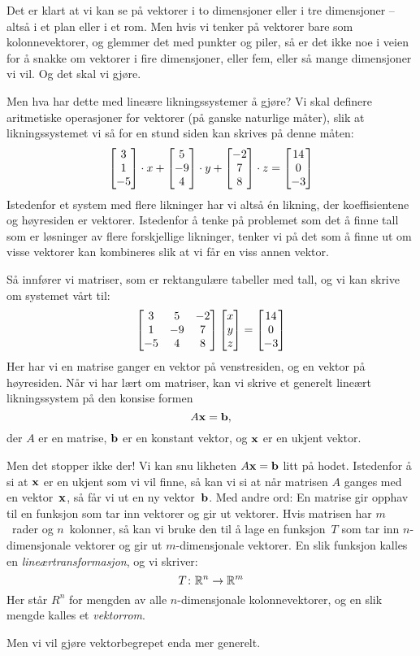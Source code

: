 Det er klart at vi kan se på vektorer i to dimensjoner eller i tre
dimensjoner -- altså i et plan eller i et rom.  Men hvis vi tenker på
vektorer bare som kolonnevektorer, og glemmer det med punkter og
piler, så er det ikke noe i veien for å snakke om vektorer i fire
dimensjoner, eller fem, eller så mange dimensjoner vi vil.  Og det
skal vi gjøre.

Men hva har dette med lineære likningssystemer å gjøre?  Vi skal
definere aritmetiske operasjoner for vektorer (på ganske naturlige
måter), slik at likningssystemet vi så for en stund siden kan skrives
på denne måten:
\[
\begin{bmatrix} 3 \\ 1 \\ -5 \end{bmatrix} \cdot x + \begin{bmatrix} 5 \\ -9 \\ 4 \end{bmatrix} \cdot y + \begin{bmatrix} -2 \\ 7 \\ 8 \end{bmatrix} \cdot z = \begin{bmatrix} 14 \\ 0 \\ -3 \end{bmatrix}
\]
Istedenfor et system med flere likninger har vi altså én likning, der
koeffisientene og høyresiden er vektorer.  Istedenfor å tenke på
problemet som det å finne tall som er løsninger av flere forskjellige
likninger, tenker vi på det som å finne ut om visse vektorer kan
kombineres slik at vi får en viss annen vektor.

Så innfører vi matriser, som er rektangulære tabeller med tall, og vi
kan skrive om systemet vårt til:
\[
\begin{bmatrix}
 3 &  5 & -2 \\
 1 & -9 &  7 \\
-5 &  4 &  8
\end{bmatrix}
\begin{bmatrix} x \\ y \\ z \end{bmatrix}
= \begin{bmatrix} 14 \\ 0 \\ -3 \end{bmatrix}
\]
Her har vi en matrise ganger en vektor på venstresiden, og en vektor
på høyresiden.  Når vi har lært om matriser, kan vi skrive et generelt
lineært likningssystem på den konsise formen
\[
A \mathbf{x} = \mathbf{b},
\]
der $A$ er en matrise, $\mathbf{b}$ er en konstant vektor, og $\mathbf{x}$ er en
ukjent vektor.

Men det stopper ikke der!  Vi kan snu likheten $A \mathbf{x} = \mathbf{b}$ litt
på hodet.  Istedenfor å si at $\mathbf{x}$ er en ukjent som vi vil finne,
så kan vi si at når matrisen $A$ ganges med en vektor~$\mathbf{x}$, så får
vi ut en ny vektor~$\mathbf{b}$.  Med andre ord: En matrise gir opphav til
en funksjon som tar inn vektorer og gir ut vektorer.  Hvis matrisen
har $m$~rader og $n$~kolonner, så kan vi bruke den til å lage en
funksjon~$T$ som tar inn $n$-dimensjonale vektorer og gir ut
$m$-dimensjonale vektorer.  En slik funksjon kalles en
\emph{lineærtransformasjon}, og vi skriver:
\[
T \colon \mathbb{R}^n \to \mathbb{R}^m
\]
Her står $R^n$ for mengden av alle $n$-dimensjonale kolonnevektorer,
og en slik mengde kalles et \emph{vektorrom}.

Men vi vil gjøre vektorbegrepet enda mer generelt.  %


